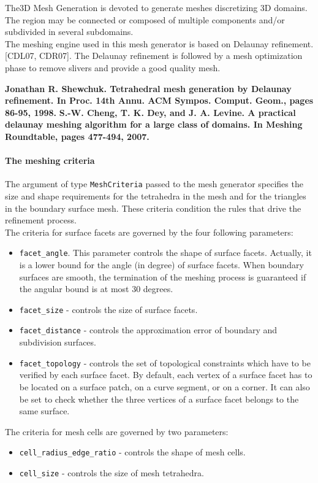 The3D Mesh Generation is devoted to generate meshes discretizing 3D domains. The region may be connected or composed of multiple components and/or subdivided in several subdomains. \\
The meshing engine used in this mesh generator is based on Delaunay refinement.  [CDL07, CDR07]. The Delaunay refinement is followed by a mesh optimization phase to remove slivers and provide a good quality mesh. 

{\bf Jonathan R. Shewchuk. Tetrahedral mesh generation by Delaunay refinement. In Proc. 14th Annu. ACM Sympos. Comput. Geom., pages 86-95, 1998. }
{\bf S.-W. Cheng, T. K. Dey, and J. A. Levine. A practical delaunay meshing algorithm for a large class of domains. In Meshing Roundtable, pages 477-494, 2007. }

\paragraph{The meshing criteria}
{
The argument of type \texttt{MeshCriteria} passed to the mesh generator specifies the size and shape requirements for the tetrahedra in the mesh and for the triangles in the boundary surface mesh. These criteria condition the rules that drive the refinement process. \\
The criteria for surface facets are governed by the four following parameters:

\begin{itemize}
\item \texttt{facet\_angle}. This parameter controls the shape of surface facets. Actually, it is a lower bound for the angle (in degree) of surface facets. When boundary surfaces are smooth, the termination of the meshing process is guaranteed if the angular bound is at most 30 degrees.
\item \texttt{facet\_size} - controls the size of surface facets. 
\item \texttt{facet\_distance} - controls the approximation error of boundary and subdivision surfaces. 
\item \texttt{facet\_topology} - controls the set of topological constraints which have to be verified by each surface facet. By default, each vertex of a surface facet has to be located on a surface patch, on a curve segment, or on a corner. It can also be set to check whether the three vertices of a surface facet belongs to the same surface.
\end{itemize}

The criteria for mesh cells are governed by two parameters:

\begin{itemize}
\item \texttt{cell\_radius\_edge\_ratio} - controls the shape of mesh cells.
\item \texttt{cell\_size} - controls the size of mesh tetrahedra.
\end{itemize}
}

